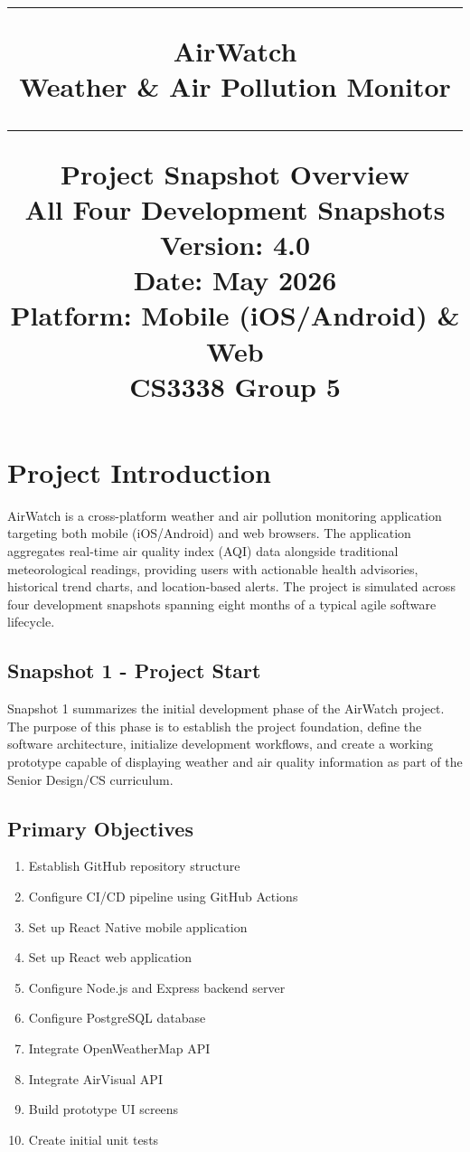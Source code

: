 \documentclass[12pt]{article}
\title{\noindent\rule{\textwidth}{0.5pt}
\huge{AirWatch} \vspace{0.1cm}\\ \large{Weather \& Air Pollution Monitor\\}
\noindent\rule{\textwidth}{0.5pt}
\Large{Project Snapshot Overview\\\small{All Four Development Snapshots\\}}
\vspace{0.1cm}
\small{ 
Version: 4.0\\ 
Date: May 2026\\
Platform: Mobile (iOS/Android) \& Web\\
CS3338 Group  5}
}
\date{}
\begin{document}
\maketitle

\tableofcontents
\newpage

\section{Project Introduction}
AirWatch is a cross-platform weather and air pollution monitoring application targeting both mobile (iOS/Android) and web browsers. The application aggregates real-time air quality index (AQI) data alongside traditional meteorological readings, providing users with actionable health advisories, historical trend charts, and location-based alerts. The project is simulated across four development snapshots spanning eight months of a typical agile software lifecycle.

\subsection{Snapshot 1 - Project Start}

Snapshot 1 summarizes the initial development phase of the AirWatch project. 
The purpose of this phase is to establish the project foundation, define the 
software architecture, initialize development workflows, and create a working 
prototype capable of displaying weather and air quality information as part of the Senior Design/CS curriculum.

\subsection{Primary Objectives}

\begin{enumerate}
    \item Establish GitHub repository structure
    \item Configure CI/CD pipeline using GitHub Actions
    \item Set up React Native mobile application
    \item Set up React web application
    \item Configure Node.js and Express backend server
    \item Configure PostgreSQL database
    \item Integrate OpenWeatherMap API
    \item Integrate AirVisual API
    \item Build prototype UI screens
    \item Create initial unit tests
\end{enumerate}
\end{document}
